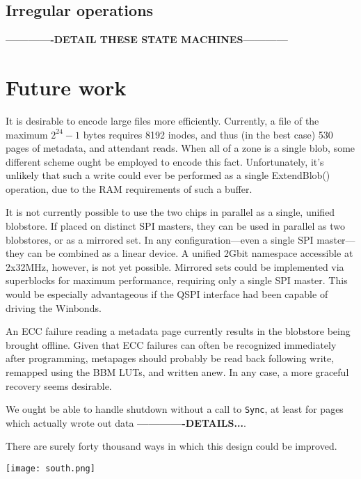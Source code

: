 \documentclass[letterpaper,10pt]{article}
\begin{document}
\subsection{Irregular operations}
\textbf{-------------DETAIL THESE STATE MACHINES------------}

\section{Future work} \label{futurework}
It is desirable to encode large files more efficiently. Currently, a file of
the maximum $2^{24}-1$ bytes requires 8192 inodes, and thus (in the best case)
530 pages of metadata, and attendant reads. When all of a zone is a single
blob, some different scheme ought be employed to encode this fact.
Unfortunately, it's unlikely that such a write could ever be performed as a
single ExtendBlob() operation, due to the RAM requirements of such a buffer.

It is not currently possible to use the two chips in parallel as a single,
unified blobstore. If placed on distinct SPI masters, they can be used in
parallel as two blobstores, or as a mirrored set. In any configuration---even
a single SPI master---they can be combined as a linear device. A unified
2Gbit namespace accessible at 2x32MHz, however, is not yet possible. Mirrored
sets could be implemented via superblocks for
maximum performance, requiring only a single SPI master. This would be especially
advantageous if the QSPI interface had been capable of driving the Winbonds.

An ECC failure reading a metadata page currently results in the blobstore being
brought offline. Given that ECC failures can often be recognized immediately
after programming, metapages should probably be read back following write,
remapped using the BBM LUTs, and written anew. In any case, a more graceful
recovery seems desirable.

We ought be able to handle shutdown without a call to \texttt{Sync}, at least
for pages which actually wrote out data \textbf{-------------DETAILS...}.

There are surely forty thousand ways in which this design could be improved.

\begin{center}
\texttt{[image: south.png]}
\end{center}

\printbibliography
\end{document}
